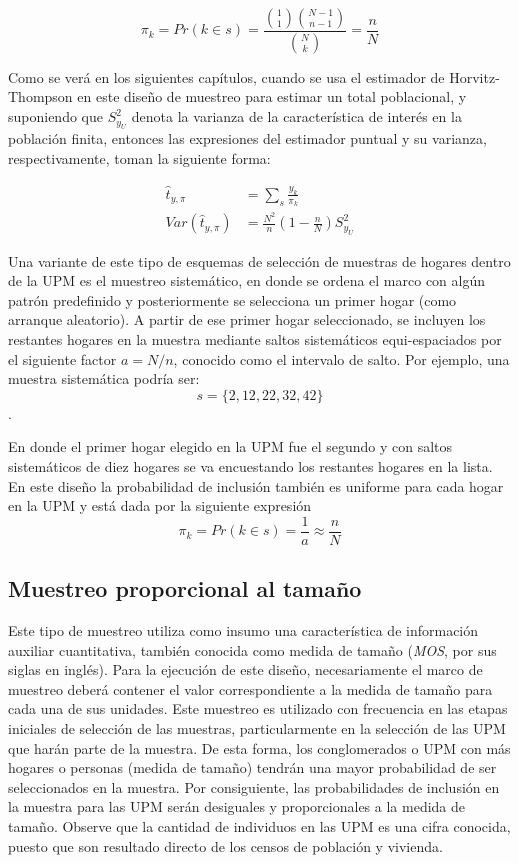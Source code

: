\documentclass[
  10pt,
  spanish,
]{book}
\begin{document}
\[\pi_k = Pr(k \in s) =  \frac{\binom{1}{1}\binom{N-1}{n-1}}{\binom{N}{k}} = \frac{n}{N}\]

Como se verá en los siguientes capítulos, cuando se usa el estimador de Horvitz-Thompson en este diseño de muestreo para estimar un total poblacional, y suponiendo que \(S^2_{y_U}\) denota la varianza de la característica de interés en la población finita, entonces las expresiones del estimador puntual y su varianza, respectivamente, toman la siguiente forma:

\begin{align*}
\hat{t}_{y,\pi} &= \sum_{s} \frac{y_k}{\pi_k} \\
Var(\hat{t}_{y,\pi}) &= \frac{N^2}{n}\left(1-\frac{n}{N}\right)S^2_{y_U}
\end{align*}

Una variante de este tipo de esquemas de selección de muestras de hogares dentro de la UPM es el muestreo sistemático, en donde se ordena el marco con algún patrón predefinido y posteriormente se selecciona un primer hogar (como arranque aleatorio). A partir de ese primer hogar seleccionado, se incluyen los restantes hogares en la muestra mediante saltos sistemáticos equi-espaciados por el siguiente factor \(a = N/n\), conocido como el intervalo de salto. Por ejemplo, una muestra sistemática podría ser:
\[s=\{2, 12, 22, 32, 42\}\].

En donde el primer hogar elegido en la UPM fue el segundo y con saltos sistemáticos de diez hogares se va encuestando los restantes hogares en la lista. En este diseño la probabilidad de inclusión también es uniforme para cada hogar en la UPM y está dada por la siguiente expresión
\[\pi_k = Pr(k \in s) = \frac{1}{a} \approx \frac{n}{N}\]

\hypertarget{muestreo-proporcional-al-tamauxf1o}{%
\subsection*{Muestreo proporcional al tamaño}\label{muestreo-proporcional-al-tamauxf1o}}

Este tipo de muestreo utiliza como insumo una característica de información auxiliar cuantitativa, también conocida como medida de tamaño (\emph{MOS}, por sus siglas en inglés). Para la ejecución de este diseño, necesariamente el marco de muestreo deberá contener el valor correspondiente a la medida de tamaño para cada una de sus unidades. Este muestreo es utilizado con frecuencia en las etapas iniciales de selección de las muestras, particularmente en la selección de las UPM que harán parte de la muestra. De esta forma, los conglomerados o UPM con más hogares o personas (medida de tamaño) tendrán una mayor probabilidad de ser seleccionados en la muestra. Por consiguiente, las probabilidades de inclusión en la muestra para las UPM serán desiguales y proporcionales a la medida de tamaño. Observe que la cantidad de individuos en las UPM es una cifra conocida, puesto que son resultado directo de los censos de población y vivienda.
\end{document}
